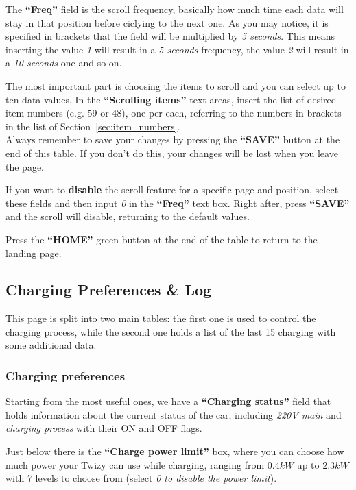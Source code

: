 The \textbf{“Freq”} field is the scroll frequency, basically how much time each data
will stay in that position before ciclying to the next one. As you may notice, it is
specified in brackets that the field will be multiplied by \textit{5 seconds}. This
means inserting the value \textit{1} will result in a \textit{5 seconds} frequency,
the value \textit{2} will result in a \textit{10 seconds} one and so on.

The most important part is choosing the items to scroll and you can select up to
ten data values. In the \textbf{“Scrolling items”} text areas, insert the list of
desired item numbers (e.g. 59 or 48), one per each, referring to the numbers in
brackets in the list of Section~\ref{sec:item_numbers}.\\

Always remember to save your changes by pressing the \textbf{“SAVE”} button at the end of this
table. If you don't do this, your changes will be lost when you leave the page.

If you want to \textbf{disable} the scroll feature for a specific page and position,
select these fields and then input \textit{0} in the \textbf{“Freq”} text box. Right after,
press \textbf{“SAVE”} and the scroll will disable, returning to the default values.

Press the \textbf{“HOME”} green button at the end of the table to return to the landing page.



\subsection{Charging Preferences \& Log}
\label{sec:web_charging_prefs}

This page is split into two main tables: the first one is used to control the charging
process, while the second one holds a list of the last 15 charging with some additional data.

\subsubsection{Charging preferences}

Starting from the most useful ones, we have a \textbf{“Charging status”} field that holds information about
the current status of the car, including \textit{220V main} and \textit{charging process}
with their ON and OFF flags.

Just below there is the \textbf{“Charge power limit”} box, where you can choose how
much power your Twizy can use while charging, ranging from $0.4 kW$  up to $2.3 kW$ with
7 levels to choose from (select \textit{0 to disable the power limit}).

